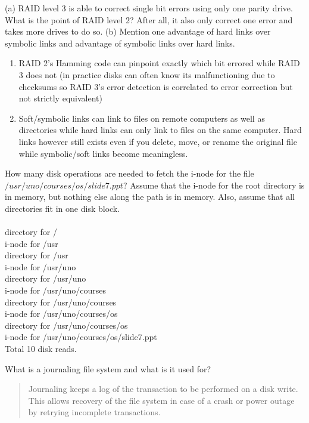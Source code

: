 \documentclass[12pt]{article}
\newenvironment{problem}[2][Problem]{\begin{trivlist}
\item[\hskip \labelsep {\bfseries #1}\hskip \labelsep {\bfseries #2.}]}{\end{trivlist}}
\begin{document}
\begin{problem}{4}
  (a) RAID level 3 is able to correct single bit errors using only one parity
drive. What is the point of RAID level 2? After all, it also only correct one error and takes more
drives to do so. (b) Mention one advantage of hard links over symbolic links and advantage of
symbolic links over hard links.
  \begin{enumerate}[label=(\alph*)]
    \item RAID 2's Hamming code can pinpoint exactly which bit errored while RAID 3 does not (in practice disks can often know its malfunctioning due to checksums so RAID 3's error detection is correlated to error correction but not strictly equivalent)
    \item Soft/symbolic links can link to files on remote computers as well as directories while hard links can only link to files on the same computer. Hard links however still exists even if you delete, move, or rename the original file while symbolic/soft links become meaningless.
  \end{enumerate}
\end{problem}

\begin{problem}{5}
  How many disk operations are needed to fetch the i-node for the file\\
$/usr/uno/courses/os/slide7.ppt$? Assume that the i-node for the root directory is in memory, but
nothing else along the path is in memory. Also, assume that all directories fit in one disk block.\\\\
directory for /\\
i-node for /usr\\
directory for /usr\\
i-node for /usr/uno\\
directory for /usr/uno\\
i-node for /usr/uno/courses\\
directory for /usr/uno/courses\\
i-node for /usr/uno/courses/os\\
directory for /usr/uno/courses/os\\
i-node for /usr/uno/courses/os/slide7.ppt\\
Total 10 disk reads.
\end{problem}
\pagebreak
\begin{problem}{6}
  What is a journaling file system and what is it used for?
  \begin{quote}
    Journaling keeps a log of the transaction to be performed on a disk write. 
    This allows recovery of the file system in case of a crash or power outage by retrying incomplete transactions.
  \end{quote}
\end{problem}
\end{document}
